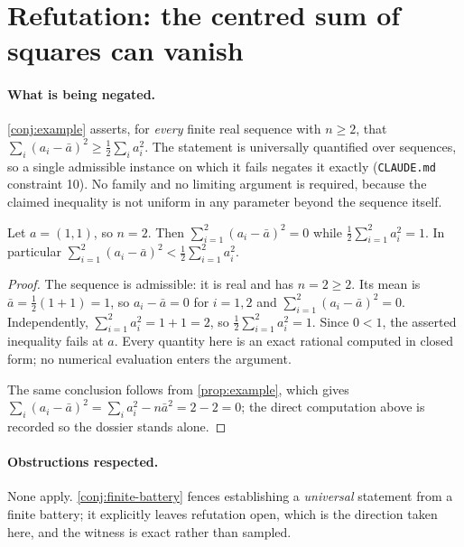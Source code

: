 \documentclass[../../main.tex]{subfiles}
\begin{document}

\section*{Refutation: the centred sum of squares can vanish}
\label{sec:sol-prop-example-refuter}

\paragraph{What is being negated.}
\ref{conj:example} asserts, for \emph{every} finite real sequence with $n \ge 2$,
that $\sum_i (a_i - \bar a)^2 \ge \tfrac12 \sum_i a_i^2$. The statement is
universally quantified over sequences, so a single admissible instance on which it
fails negates it exactly (\texttt{CLAUDE.md} constraint 10). No family and no
limiting argument is required, because the claimed inequality is not uniform in any
parameter beyond the sequence itself.

\begin{theorem}
\label{thm:sol-prop-example-refuter}
  Let $a = (1,1)$, so $n = 2$. Then $\sum_{i=1}^2 (a_i - \bar a)^2 = 0$ while
  $\tfrac12 \sum_{i=1}^2 a_i^2 = 1$. In particular
  $\sum_{i=1}^2 (a_i - \bar a)^2 < \tfrac12 \sum_{i=1}^2 a_i^2$.
\end{theorem}

\begin{proof}
  The sequence is admissible: it is real and has $n = 2 \ge 2$. Its mean is
  $\bar a = \tfrac12(1 + 1) = 1$, so $a_i - \bar a = 0$ for $i = 1,2$ and
  $\sum_{i=1}^2 (a_i - \bar a)^2 = 0$. Independently,
  $\sum_{i=1}^2 a_i^2 = 1 + 1 = 2$, so $\tfrac12\sum_{i=1}^2 a_i^2 = 1$. Since
  $0 < 1$, the asserted inequality fails at $a$. Every quantity here is an exact
  rational computed in closed form; no numerical evaluation enters the argument.

  The same conclusion follows from \ref{prop:example}, which gives
  $\sum_i (a_i - \bar a)^2 = \sum_i a_i^2 - n\bar a^2 = 2 - 2 = 0$; the direct
  computation above is recorded so the dossier stands alone.
\end{proof}

\paragraph{Obstructions respected.}
None apply. \ref{conj:finite-battery} fences establishing a \emph{universal} statement from a
finite battery; it explicitly leaves refutation open, which is the direction taken here,
and the witness is exact rather than sampled.
\end{document}
